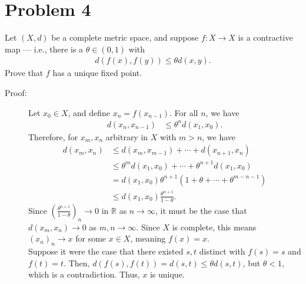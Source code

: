 \documentclass[10pt]{extarticle}
\newcommand{\R}{\mathbb{R}}
\begin{document}
  \section{Problem 4}%
  Let $(X,d)$ be a complete metric space, and suppose $f: X\rightarrow X$ is a contractive map --- i.e., there is a $\theta \in (0,1)$ with
  \begin{align*}
    d(f(x),f(y)) \leq \theta d(x,y).
  \end{align*}
  Prove that $f$ has a unique fixed point.
  \begin{description}
    \item[Proof:] Let $x_0\in X$, and define $x_{n} = f(x_{n-1})$. For all $n$, we have
      \begin{align*}
        d(x_{n},x_{n-1}) &\leq \theta^{n}d(x_1,x_0).
      \end{align*}
      Therefore, for $x_m,x_n$ arbitrary in $X$ with $m > n$, we have
      \begin{align*}
        d(x_m,x_n) &\leq d(x_m,x_{m-1}) + \cdots + d(x_{n+1},x_n)\\
                   &\leq \theta^{m}d(x_1,x_0) + \cdots + \theta^{n+1}d(x_1,x_0)\\
                   &= d(x_1,x_0) \theta^{n+1}\left(1 + \theta + \cdots + \theta^{m-n-1}\right)\\
                   &\leq d(x_1,x_0)\frac{\theta^{n+1}}{1-\theta}.
      \end{align*}
      Since $\left(\frac{\theta^{n+1}}{1-\theta}\right)_n\rightarrow 0$ in $\R$ as $n\rightarrow\infty$, it must be the case that $d(x_m,x_n)\rightarrow 0$ as $m,n\rightarrow \infty$. Since $X$ is complete, this means $(x_n)_n\rightarrow x$ for some $x\in X$, meaning $f(x) = x$.\\

      Suppose it were the case that there existed $s,t$ distinct with $f(s) = s$ and $f(t) = t$. Then, $d(f(s),f(t)) = d(s,t) \leq \theta d(s,t)$, but $\theta < 1$, which is a contradiction. Thus, $x$ is unique.
  \end{description}
\end{document}

